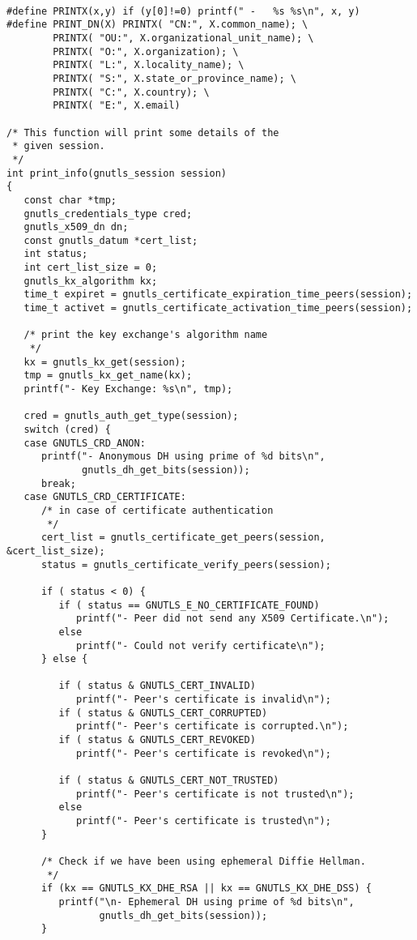 \begin{verbatim}

#define PRINTX(x,y) if (y[0]!=0) printf(" -   %s %s\n", x, y)
#define PRINT_DN(X) PRINTX( "CN:", X.common_name); \
        PRINTX( "OU:", X.organizational_unit_name); \
        PRINTX( "O:", X.organization); \
        PRINTX( "L:", X.locality_name); \
        PRINTX( "S:", X.state_or_province_name); \
        PRINTX( "C:", X.country); \
        PRINTX( "E:", X.email)

/* This function will print some details of the
 * given session.
 */
int print_info(gnutls_session session)
{
   const char *tmp;
   gnutls_credentials_type cred;
   gnutls_x509_dn dn;
   const gnutls_datum *cert_list;
   int status;
   int cert_list_size = 0;
   gnutls_kx_algorithm kx;
   time_t expiret = gnutls_certificate_expiration_time_peers(session);
   time_t activet = gnutls_certificate_activation_time_peers(session);

   /* print the key exchange's algorithm name
    */
   kx = gnutls_kx_get(session);
   tmp = gnutls_kx_get_name(kx);
   printf("- Key Exchange: %s\n", tmp);

   cred = gnutls_auth_get_type(session);
   switch (cred) {
   case GNUTLS_CRD_ANON:
      printf("- Anonymous DH using prime of %d bits\n",
             gnutls_dh_get_bits(session));
      break;
   case GNUTLS_CRD_CERTIFICATE:
      /* in case of certificate authentication
       */
      cert_list = gnutls_certificate_get_peers(session, &cert_list_size);
      status = gnutls_certificate_verify_peers(session);
      
      if ( status < 0) {
         if ( status == GNUTLS_E_NO_CERTIFICATE_FOUND)
            printf("- Peer did not send any X509 Certificate.\n");
         else
            printf("- Could not verify certificate\n");
      } else {

         if ( status & GNUTLS_CERT_INVALID)
            printf("- Peer's certificate is invalid\n");
         if ( status & GNUTLS_CERT_CORRUPTED)
            printf("- Peer's certificate is corrupted.\n");
         if ( status & GNUTLS_CERT_REVOKED)
            printf("- Peer's certificate is revoked\n");

         if ( status & GNUTLS_CERT_NOT_TRUSTED)
            printf("- Peer's certificate is not trusted\n");
         else
            printf("- Peer's certificate is trusted\n");
      }

      /* Check if we have been using ephemeral Diffie Hellman.
       */
      if (kx == GNUTLS_KX_DHE_RSA || kx == GNUTLS_KX_DHE_DSS) {
         printf("\n- Ephemeral DH using prime of %d bits\n",
                gnutls_dh_get_bits(session));
      }


\end{verbatim}
